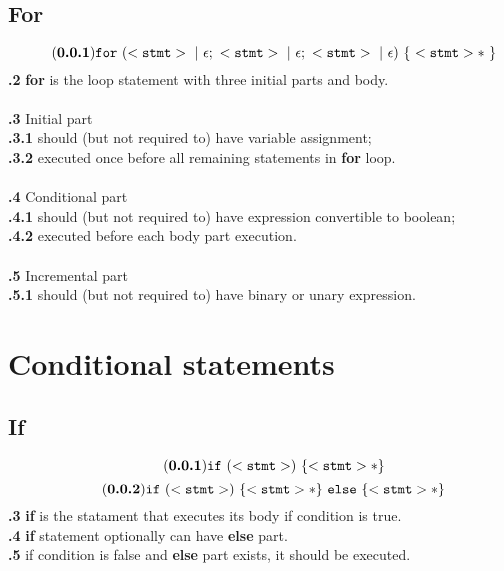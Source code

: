 \documentclass[leqno]{article}
\begin{document}
        \subsection{For}
            \begin{equation} \tag{\textbf{\thesubsection.1}}
                \tt{for\ (<stmt>\ |\ \epsilon;\ <stmt>\ |\ \epsilon;\ <stmt>\ |\ \epsilon)\ \{\ <stmt>*\ \}}
            \end{equation}
            \textbf{\thesubsection.2} \textbf{for} is the loop statement with three initial parts
            and body. \\
            \\
            \textbf{\thesubsection.3} Initial part \\
            \textbf{\thesubsection.3.1} should (but not required to) have variable
            assignment; \\
            \textbf{\thesubsection.3.2} executed once before all remaining statements in
            \textbf{for} loop. \\
            \\
            \textbf{\thesubsection.4} Conditional part \\
            \textbf{\thesubsection.4.1} should (but not required to) have expression convertible to boolean; \\
            \textbf{\thesubsection.4.2} executed before each body part execution. \\
            \\
            \textbf{\thesubsection.5} Incremental part \\
            \textbf{\thesubsection.5.1} should (but not required to) have binary or unary expression.

    \section{Conditional statements}
        \subsection{If}
            \begin{equation} \tag{\textbf{\thesubsection.1}}
                \tt{if\ ( <stmt> )\ \{ <stmt>* \}}
            \end{equation}
            \begin{equation} \tag{\textbf{\thesubsection.2}}
                \tt{if\ ( <stmt> )\ \{ <stmt>* \}\ else\ \{ <stmt>* \}}
            \end{equation}
            \textbf{\thesubsection.3} \textbf{if} is the statament that executes its body if condition is true. \\
            \textbf{\thesubsection.4} \textbf{if} statement optionally can have \textbf{else} part. \\
            \textbf{\thesubsection.5} if condition is false and \textbf{else} part exists, it
            should be executed.
\end{document}

